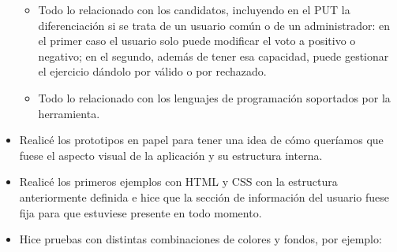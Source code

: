 \begin{itemize}
\begin{itemize}
\item
Todo lo relacionado con los candidatos, incluyendo en el PUT la diferenciación si se trata de un usuario común o de un administrador: en el primer caso el usuario solo puede modificar el voto a positivo o negativo; en el segundo, además de tener esa capacidad, puede gestionar el ejercicio dándolo por válido o por rechazado.

\item
Todo lo relacionado con los lenguajes de programación soportados por la herramienta.

\end{itemize}
    
\item
Realicé los prototipos en papel para tener una idea de cómo queríamos que fuese el aspecto visual de la aplicación y su estructura interna.

\item
Realicé los primeros ejemplos con HTML y CSS con la estructura anteriormente definida e hice que la sección de información del usuario fuese fija para que estuviese presente en todo momento.

\item
Hice pruebas con distintas combinaciones de colores y fondos, por ejemplo:

\begin{figure}[H]
\begin{center}
\end{center}
\end{figure}

\begin{figure}[H]
\begin{center}
\end{center}
\end{figure}


\end{itemize}
